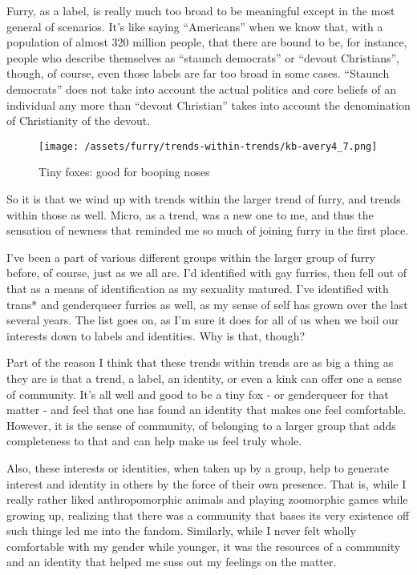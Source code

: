 Furry, as a label, is really much too broad to be meaningful except in
the most general of scenarios. It's like saying ``Americans'' when we
know that, with a population of almost 320 million people, that there
are bound to be, for instance, people who describe themselves as
``staunch democrats'' or ``devout Christians'', though, of course, even
those labels are far too broad in some cases. ``Staunch democrats'' does
not take into account the actual politics and core beliefs of an
individual any more than ``devout Christian'' takes into account the
denomination of Christianity of the devout.

\begin{figure}[htbp]
\centering
\texttt{[image: /assets/furry/trends-within-trends/kb-avery4\_7.png]}
\caption{Tiny foxes: good for booping noses}
\end{figure}

So it is that we wind up with trends within the larger trend of furry,
and trends within those as well. Micro, as a trend, was a new one to me,
and thus the sensation of newness that reminded me so much of joining
furry in the first place.

I've been a part of various different groups within the larger group of
furry before, of course, just as we all are. I'd identified with gay
furries, then fell out of that as a means of identification as my
sexuality matured. I've identified with trans* and genderqueer furries
as well, as my sense of self has grown over the last several years. The
list goes on, as I'm sure it does for all of us when we boil our
interests down to labels and identities. Why is that, though?

Part of the reason I think that these trends within trends are as big a
thing as they are is that a trend, a label, an identity, or even a kink
can offer one a sense of community. It's all well and good to be a tiny
fox - or genderqueer for that matter - and feel that one has found an
identity that makes one feel comfortable. However, it is the sense of
community, of belonging to a larger group that adds completeness to that
and can help make us feel truly whole.

Also, these interests or identities, when taken up by a group, help to
generate interest and identity in others by the force of their own
presence. That is, while I really rather liked anthropomorphic animals
and playing zoomorphic games while growing up, realizing that there was
a community that bases its very existence off such things led me into
the fandom. Similarly, while I never felt wholly comfortable with my
gender while younger, it was the resources of a community and an
identity that helped me suss out my feelings on the matter.

